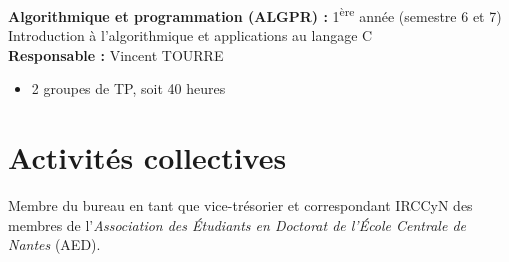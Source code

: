 \noindent
\textbf{Algorithmique et programmation (ALGPR) :} 1\textsuperscript{ère} année (semestre 6 et 7)\\
Introduction à l'algorithmique et applications au langage C\\
\textbf{Responsable :} Vincent TOURRE
\begin{itemize}
  \item 2 groupes de TP, soit 40 heures
\end{itemize}

\section{Activités collectives}
Membre du bureau en tant que vice-trésorier et correspondant IRCCyN des membres de l'\emph{Association des Étudiants en Doctorat de l'École Centrale de Nantes} (AED).
